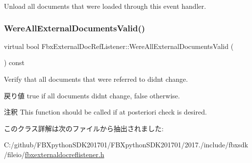 Unload all documents that were loaded through this event handler. \mbox{\label{class_fbx_external_doc_ref_listener_a7a7e4947b7f4a250365a8761fb71cd1e}} 
\subsubsection{\texorpdfstring{Were\+All\+External\+Documents\+Valid()}{WereAllExternalDocumentsValid()}}
{\footnotesize\ttfamily virtual bool Fbx\+External\+Doc\+Ref\+Listener\+::\+Were\+All\+External\+Documents\+Valid (\begin{DoxyParamCaption}{ }\end{DoxyParamCaption}) const\hspace{0.3cm}{\ttfamily [virtual]}}

Verify that all documents that were referred to didn\textquotesingle{}t change. \begin{DoxyReturn}{戻り値}
{\ttfamily true} if all documents didn\textquotesingle{}t change, {\ttfamily false} otherwise. 
\end{DoxyReturn}
\begin{DoxyRemark}{注釈}
This function should be called if at posteriori check is desired. 
\end{DoxyRemark}


このクラス詳解は次のファイルから抽出されました\+:\begin{DoxyCompactItemize}
\item 
C\+:/github/\+F\+B\+Xpython\+S\+D\+K201701/\+F\+B\+Xpython\+S\+D\+K201701/2017./include/fbxsdk/fileio/\hyperlink{fbxexternaldocreflistener_8h}{fbxexternaldocreflistener.\+h}\end{DoxyCompactItemize}
